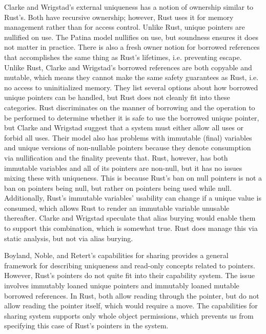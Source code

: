 Clarke and Wrigstad's external uniqueness \cite{externaluniqueness} has a notion
of ownership similar to Rust's. Both have recursive ownership; however, Rust uses
it for memory management rather than for access control.
Unlike Rust, unique pointers are nullified on use. The Patina model nullifies on use,
but soundness ensures it does not matter in practice.
There is also a fresh owner notion for borrowed references that accomplishes the same
thing as Rust's lifetimes, i.e. preventing escape.
Unlike Rust, Clarke and Wrigstad's borrowed references are both copyable and mutable,
which means they cannot make the same safety guarantees as Rust, i.e. no access to
uninitialized memory.
They list several options about how borrowed unique pointers can be handled, but
Rust does not cleanly fit into these categories. Rust discriminates on the manner of borrowing
and the operation to be performed to determine whether it is safe to use the borrowed
unique pointer, but Clarke and Wrigstad suggest that a system must either allow all uses
or forbid all uses.
Their model also has problems with immutable (final) variables and unique versions
of non-nullable pointers because they denote consumption via nullification and the finality
prevents that. Rust, however, has both immutable variables and all of its pointers are non-null,
but it has no issues mixing these with uniqueness. This is because Rust's ban on null pointers
is not a ban on pointers being null, but rather on pointers being used while null.
Additionally, Rust's immutable variables' usability can change if a unique value is consumed,
which allows Rust to render an immutable variable unusable thereafter.
Clarke and Wrigstad speculate that alias burying would enable them to support this combination,
which is somewhat true. Rust does manage this via static analysis, but not via alias burying.

Boyland, Noble, and Retert's capabilities for sharing \cite{capabilitiesforsharing}
provides a general framework for describing uniqueness and read-only concepts related
to pointers. However, Rust's pointers do not quite fit into their capability system.
The issue involves immutably loaned unique pointers and immutably loaned mutable borrowed
references. In Rust, both allow reading through the pointer, but do not allow reading
the pointer itself, which would require a move. The capabilities for sharing system
supports only whole object permissions, which prevents us from specifying this case
of Rust's pointers in the system.

